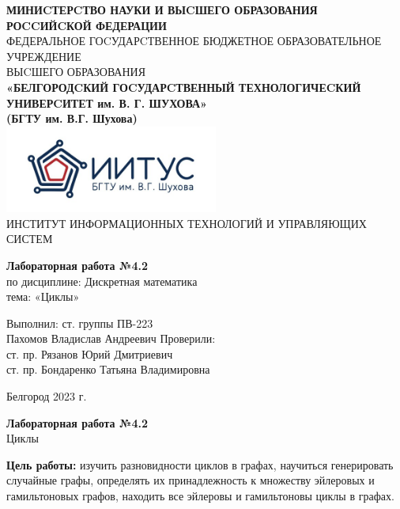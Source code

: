 \documentclass[a4paper,14pt]{extarticle}
\newcommand\textbox[1]{
	\parbox{.45\textwidth}{#1}
}
\begin{document}
\begin{center}
    \small{
        \textbf{МИНИCТЕРCТВО НАУКИ И ВЫCШЕГО ОБРАЗОВАНИЯ РОCCИЙCКОЙ ФЕДЕРАЦИИ}\\
        ФЕДЕРАЛЬНОЕ ГОCУДАРCТВЕННОЕ БЮДЖЕТНОЕ ОБРАЗОВАТЕЛЬНОЕ УЧРЕЖДЕНИЕ\\ВЫCШЕГО ОБРАЗОВАНИЯ \\
        \textbf{«БЕЛГОРОДCКИЙ ГОCУДАРCТВЕННЫЙ ТЕХНОЛОГИЧЕCКИЙ\\УНИВЕРCИТЕТ им. В. Г. ШУХОВА»\\ (БГТУ им. В.Г. Шухова)} \\
        \bigbreak
        \includegraphics[width=70mm]{log}\\
        ИНСТИТУТ ИНФОРМАЦИОННЫХ ТЕХНОЛОГИЙ И УПРАВЛЯЮЩИХ СИСТЕМ\\}
\end{center}

\vfill
\begin{center}
    \large{
        \textbf{
            Лабораторная работа №4.2}}\\
    \normalsize{
        по дисциплине: Дискретная математика \\
        тема: «Циклы»}
\end{center}
\vfill
\hfill\textbox{
    Выполнил: ст. группы ПВ-223\\Пахомов Владислав Андреевич
    \bigbreak
    Проверили: \\ст. пр. Рязанов Юрий Дмитриевич\\
    ст. пр. Бондаренко Татьяна Владимировна
}
\vfill\begin{center}
    Белгород 2023 г.
\end{center}
\newpage
\begin{center}
    \textbf{Лабораторная работа №4.2}\\
    Циклы
\end{center}
\textbf{Цель работы: }изучить разновидности циклов в графах, научиться генерировать случайные графы,
определять их принадлежность к множеству эйлеровых и гамильтоновых графов, находить все эйлеровы и гамильтоновы циклы в графах.
\end{document}
